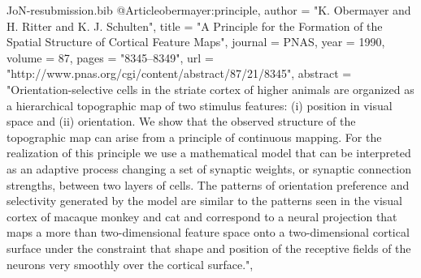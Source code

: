 \documentclass{article}
\begin{document}
\begin{filecontents}{JoN-resubmission.bib}
@Article{obermayer:principle,
  author       = "K. Obermayer and H. Ritter and K. J. Schulten",
  title	       = "A Principle for the Formation of the Spatial
                  Structure of Cortical Feature Maps",
  journal      = PNAS,
  year	       = 1990,
  volume       = 87,
  pages	       = "8345--8349",
  url	       = "http://www.pnas.org/cgi/content/abstract/87/21/8345",
  abstract     = "Orientation-selective cells in the striate cortex of
                  higher animals are organized as a hierarchical
                  topographic map of two stimulus features: (i)
                  position in visual space and (ii) orientation. We
                  show that the observed structure of the topographic
                  map can arise from a principle of continuous
                  mapping. For the realization of this principle we
                  use a mathematical model that can be interpreted as
                  an adaptive process changing a set of synaptic
                  weights, or synaptic connection strengths, between
                  two layers of cells. The patterns of orientation
                  preference and selectivity generated by the model
                  are similar to the patterns seen in the visual
                  cortex of macaque monkey and cat and correspond to a
                  neural projection that maps a more than
                  two-dimensional feature space onto a two-dimensional
                  cortical surface under the constraint that shape and
                  position of the receptive fields of the neurons very
                  smoothly over the cortical surface.",
}


\end{filecontents}
\end{document}
